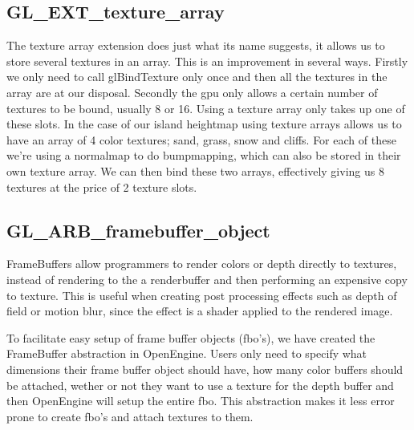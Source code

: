 \subsection{GL\_EXT\_texture\_array}

The texture array extension does just what its name suggests, it
allows us to store several textures in an array. This is an
improvement in several ways. Firstly we only need to call
glBindTexture only once and then all the textures in the array are at
our disposal. Secondly the gpu only allows a certain number of
textures to be bound, usually 8 or 16. Using a texture array only
takes up one of these slots. In the case of our island heightmap using
texture arrays allows us to have an array of 4 color textures; sand, grass, snow
and cliffs. For each of these we're using a normalmap to do
bumpmapping, which can also be stored in their own texture array. We
can then bind these two arrays, effectively giving us 8 textures at
the price of 2 texture slots.

\subsection{GL\_ARB\_framebuffer\_object}

FrameBuffers allow programmers to render colors or depth directly to
textures, instead of rendering to the a renderbuffer and then performing
an expensive copy to texture. This is useful when creating post
processing effects such as depth of field or motion blur, since the
effect is a shader applied to the rendered image.


To facilitate easy setup of frame buffer objects (fbo's), we have created the
FrameBuffer abstraction in OpenEngine. Users only need to specify what
dimensions their frame buffer object should have, how many color
buffers should be attached, wether or not they want to use a
texture for the depth buffer and then OpenEngine will setup the entire
fbo. This abstraction makes it less error prone to
create fbo's and attach textures to them.



